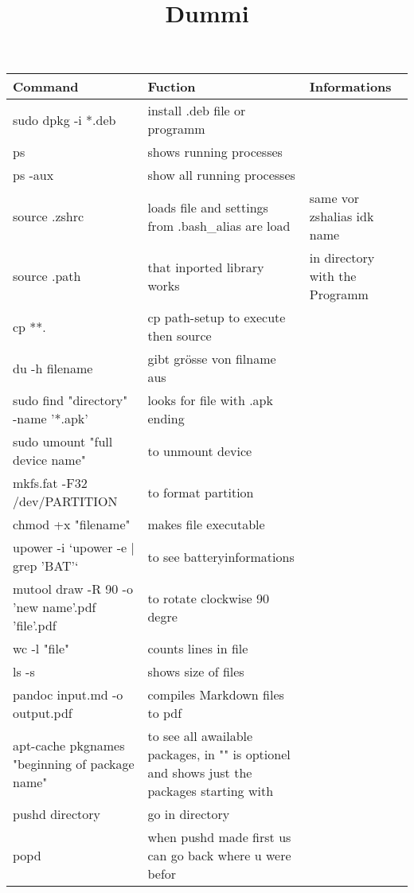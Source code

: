 \documentclass[12pt]{article}
\title{Dummi}
\begin{document}
\setlength{\parindent}{0pt}
\setlength{\parskip}{30pt}
\setlength{\baselineskip}{20pt}




\centering
\begin{tabular}{| p{6.5cm} | p{6.5cm} | p{6.5cm} |}
    \hline
    Command & Fuction & Informations \\
    \hline
    sudo dpkg -i *.deb & install .deb file or programm \\
    \hline
    ps & shows running processes & \\
    \hline
    ps -aux & show all running processes & \\
    \hline
    source .zshrc & loads file and settings from .bash\_alias are load & same vor zshalias idk name  \\
    \hline
    source .path & that inported library works & in directory with the Programm \\
    \hline 
    cp **. & cp path-setup to execute then source &\\
    \hline
    du -h filename & gibt grösse von filname aus & \\
    \hline
    sudo find "directory" -name '*.apk' & looks for file with .apk ending &\\
    \hline 
    sudo umount "full device name" & to unmount device & \\
    \hline 
    mkfs.fat -F32 /dev/PARTITION & to format partition &\\
    \hline 
    chmod +x "filename" & makes file executable &\\
    \hline
    upower -i `upower -e | grep 'BAT'` & to see batteryinformations &\\
    \hline
    mutool draw -R 90 -o 'new name'.pdf 'file'.pdf & to rotate clockwise 90 degre &\\
    \hline 
    wc -l "file" & counts lines in file &\\
    \hline
    ls -s & shows size of files &\\
    \hline
    pandoc input.md -o output.pdf & compiles Markdown files to pdf\\
    \hline
    apt-cache pkgnames "beginning of package name"& to see all awailable packages, in "" is optionel and shows just the packages starting with \\
    \hline
    pushd directory & go in directory \\
    \hline 
    popd & when pushd made first us can go back where u were befor \\
    \hline

\end{tabular}
\end{document}
